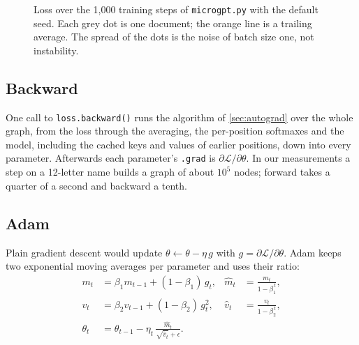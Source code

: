 \documentclass[11pt,letterpaper]{article}
\theoremstyle{remark}
\newcommand{\code}[1]{\lstinline[basicstyle=\ttfamily\small]|#1|}
\begin{document}
\begin{figure}[t]
\centering
{}
\caption{Loss over the 1{,}000 training steps of \texttt{microgpt.py} with the default seed. Each grey dot is one document; the orange line is a trailing average. The spread of the dots is the noise of batch size one, not instability.}
\label{fig:loss}
\end{figure}

\subsection{Backward}

One call to \code{loss.backward()} runs the algorithm of \cref{sec:autograd} over the whole graph, from the loss through the averaging, the per-position softmaxes and the model, including the cached keys and values of earlier positions, down into every parameter. Afterwards each parameter's \code{.grad} is $\partial\mathcal L/\partial\theta$. In our measurements a step on a 12-letter name builds a graph of about $10^5$ nodes; forward takes a quarter of a second and backward a tenth.

\subsection{Adam}

Plain gradient descent would update $\theta \leftarrow \theta - \eta\,g$ with $g = \partial\mathcal L/\partial\theta$. Adam \parencite{kingma2015adam} keeps two exponential moving averages per parameter and uses their ratio:
\begin{align}
m_t &= \beta_1 m_{t-1} + (1-\beta_1)\, g_t, &\hat m_t &= \frac{m_t}{1-\beta_1^{\,t}}, \\
v_t &= \beta_2 v_{t-1} + (1-\beta_2)\, g_t^2, &\hat v_t &= \frac{v_t}{1-\beta_2^{\,t}}, \\
\theta_t &= \theta_{t-1} - \eta_t\,\frac{\hat m_t}{\sqrt{\hat v_t}+\epsilon}.
\end{align}
\end{document}
